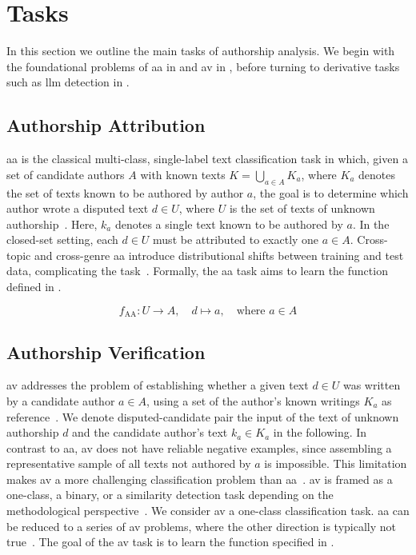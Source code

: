 \section{Tasks}
\label{sec:tasks}

In this section we outline the main tasks of authorship analysis. 
We begin with the foundational problems of \ac{aa} in  and \ac{av} in , before turning to derivative tasks such as \ac{llm} detection in .

\subsection{Authorship Attribution}
\label{subsec:def_aa}

\ac{aa} is the classical multi-class, single-label text classification task in which, given a set of candidate authors $A$ with known texts $K=\bigcup_{a\in A} K_a$, where $K_a$ denotes the set of texts known to be authored by author $a$, the goal is to determine which author wrote a disputed text $d \in U$, where $U$ is the set of texts of unknown authorship~\citep{koppel_authorship_2004,barlas_cross_domain_2020}. 
Here, $k_a$ denotes a single text known to be authored by $a$.
In the closed-set setting, each $d \in U$ must be attributed to exactly one $a \in A$. 
Cross-topic and cross-genre \ac{aa} introduce distributional shifts between training and test data, complicating the task~\citep{barlas_cross_domain_2020}.
Formally, the \ac{aa} task aims to learn the function defined in .

\begin{equation}
f_{\text{AA}} : U \to A, \quad d \mapsto a, \quad \text{where } a \in A
\label{eq:authorship_attribution_function}
\end{equation}


\subsection{Authorship Verification}
\label{subsec:def_av}
\ac{av} addresses the problem of establishing whether a given text $d \in U$ was written by a candidate author $a \in A$, using a set of the author’s known writings $K_a$ as reference~\citep{koppel_authorship_2004}.
We denote disputed-candidate pair the input of the text of unknown authorship $d$ and the candidate author's text $k_a \in K_a$ in the following.
In contrast to \ac{aa}, \ac{av} does not have reliable negative examples, since assembling a representative sample of all texts not authored by 
$a$ is impossible. 
This limitation makes \ac{av} a more challenging classification problem than \ac{aa}~\citep{llm_detection_av_2025,neal_surveying_2018,koppel_authorship_2004}.
\ac{av} is framed as a one-class, a binary, or a similarity detection task depending on the methodological perspective~\citep{neal_surveying_2018,koppel_authorship_2004}.  
We consider \ac{av} a one-class classification task.
\ac{aa} can be reduced to a series of \ac{av} problems, where the other direction is typically not true~\citep{barlas_cross_domain_2020,tyo_state_2022}.
The goal of the \ac{av} task is to learn the function specified in .

